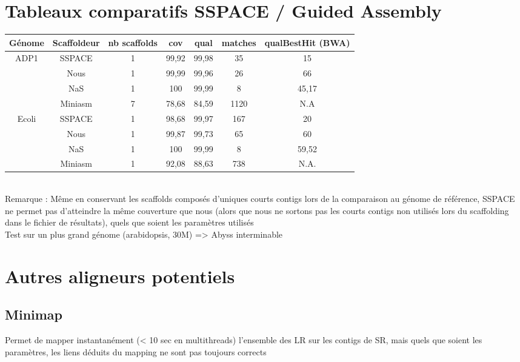 \documentclass[12pt]{article}
\begin{document}
\section{Tableaux comparatifs SSPACE / Guided Assembly}

\begin{tabular}{|c|c|c|c|c|c|c|}
	\hline
	Génome & Scaffoldeur & nb scaffolds & cov & qual & matches & qualBestHit (BWA) \\
	\hline
	\multirow{2}{*}{ADP1} & SSPACE & 1 & 99,92 & 99,98 & 35 & 15 \\
	& Nous & 1 & 99,99 & 99,96 & 26 & 66 \\
	& NaS & 1 & 100 & 99,99 & 8 & 45,17 \\
	& Miniasm & 7 & 78,68 & 84,59 & 1120 & N.A \\
	\hline
	\multirow{2}{*}{Ecoli} & SSPACE & 1 & 98,68 & 99,97 & 167 & 20 \\
	& Nous & 1 & 99,87 & 99,73 & 65 & 60  \\
	& NaS & 1 & 100 & 99,99 & 8 & 59,52 \\
	& Miniasm & 1 & 92,08 & 88,63 & 738 & N.A. \\
	\hline
\end{tabular} \\

Remarque : Même en conservant les scaffolds composés d'uniques courts contigs lors de la comparaison au génome de référence, SSPACE ne permet pas d'atteindre la même couverture que nous (alors que nous ne sortons pas les courts contigs non utilisés lors du scaffolding dans le fichier de résultats), quels que soient les paramètres utilisés \\

Test sur un plus grand génome (arabidopsis, 30M) => Abyss interminable \\

\section{Autres aligneurs potentiels}

\subsection{Minimap}

Permet de mapper instantanément (< 10 sec en multithreads) l'ensemble des LR sur les contigs de SR, mais quels que soient les paramètres, les liens
déduits du mapping ne sont pas toujours corrects
\end{document}
